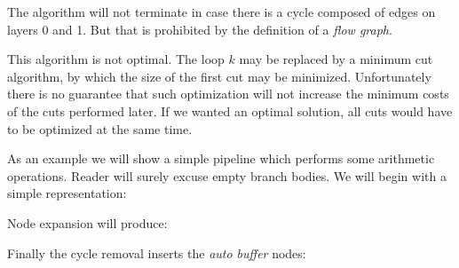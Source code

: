 \begin{rem}
  The algorithm will not terminate in case there is a cycle composed of edges on layers 0 and 1. But that is prohibited by the definition of a \emph{flow graph}.
\end{rem}

This algorithm is not optimal. The loop $k$ may be replaced by a minimum cut algorithm, by which the size of the first cut may be minimized. Unfortunately there is no guarantee that such optimization will not increase the minimum costs of the cuts performed later. If we wanted an optimal solution, all cuts would have to be optimized at the same time. 

\parspace

As an example we will show a simple pipeline which performs some arithmetic operations. Reader will surely excuse empty branch bodies. We will begin with a simple representation:


Node expansion will produce:


Finally the cycle removal inserts the \emph{auto buffer} nodes:


